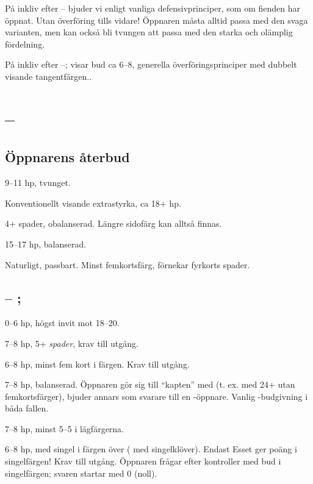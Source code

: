 P{\aa} inkliv efter -- bjuder vi enligt vanliga defensivprinciper, 
som om fienden har {\"o}ppnat. Utan överföring tills vidare!
{\"O}ppnaren m{\aa}sta alltid passa med den svaga 
varianten, men kan ocks{\aa} bli tvungen att passa med den 
starka och ol{\"a}mplig
f{\"o}rdelning.

P{\aa} inkliv efter --;  visar bud 
ca 6--8, generella överföringsprinciper med dubbelt visande tangentfärgen..

\section{ -- }
\subsection{\"Oppnarens {\aa}terbud}

\bbe
   \item[pass] 9--11 hp, tvunget.
   \item[\hj{1}] Konventionellt visande extrastyrka, ca 18+ hp.
   \item[\spa{1}] 4+ spader, obalanserad. Längre sidofärg kan alltså finnas.
   \item[\NT{1}] 15--17 hp, balanserad.
   \item[\la{2}, \hj{2}] Naturligt, passbart. Minst femkortsf\"arg,
   förnekar fyrkorts spader.
\ebe

\subsection{ -- ; }

\bbe
   \item[\spa{1}] 0--6 hp, h\"ogst invit mot 18--20.
   \item[\NT{1}] 7--8 hp, 5+ \emph{spader}, krav till utg{\aa}ng.
   \item[\la{2} \hj{2}] 6--8 hp, minst fem kort i f\"argen. Krav 
                        till utg{\aa}ng.
   \item[\spa{2}] 7--8 hp, balanserad. Öppnaren g\"or sig till ``kapten''
                  med  (t. ex. med 24+ utan femkortsf\"arger),
                  bjuder annars som svarare till en
                  -\"oppnare. Vanlig -budgivning i båda fallen.
   \item[\NT{2}] 7--8 hp, minst 5--5 i l{\aa}gf\"argerna.
   \item[\la{3}, \ho{3}] 6--8 hp,  med singel i
                  f\"argen \"over ( med singelkl\"over). Endast Esset
                  ger po\"ang i singelf\"argen!
                  Krav till utg{\aa}ng. Öppnaren fr{\aa}gar efter kontroller
                  med bud i singelf\"argen; svaren startar med 0 (noll).
\ebe

